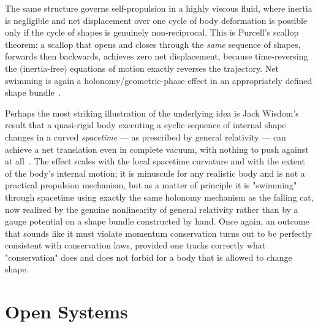 The same structure governs self-propulsion in a highly viscous
fluid, where inertia is negligible and net displacement over one
cycle of body deformation is possible only if the cycle of shapes is
genuinely non-reciprocal. This is Purcell's scallop theorem: a
scallop that opens and closes through the \emph{same} sequence of
shapes, forwards then backwards, achieves zero net displacement,
because time-reversing the (inertia-free) equations of motion
exactly reverses the trajectory. Net swimming is again a
holonomy/geometric-phase effect in an appropriately defined shape
bundle~\cite{shapere+wilczek-swim}.

Perhaps the most striking illustration of the underlying idea is Jack
Wisdom's result that a quasi-rigid body executing a cyclic sequence
of internal shape changes in a curved \emph{spacetime} --- as
prescribed by general relativity --- can achieve a net translation
even in complete vacuum, with nothing to push against at
all~\cite{wisdom}. The effect scales with the local spacetime
curvature and with the extent of the body's internal motion; it is
minuscule for any realistic body and is not a practical propulsion
mechanism, but as a matter of principle it is "swimming" through
spacetime using exactly the same holonomy mechanism as the falling
cat, now realized by the genuine nonlinearity of general relativity
rather than by a gauge potential on a shape bundle constructed by
hand. Once again, an outcome that sounds like it must violate
momentum conservation turns out to be perfectly consistent with
conservation laws, provided one tracks correctly what "conservation"
does and does not forbid for a body that is allowed to change shape.

\section{Open Systems}
\label{ap:open}

